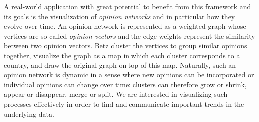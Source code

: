A real-world application with great potential to benefit from this framework and its goals is the visualization of \emph{opinion networks} \cite{betz2019applying} and in particular how they evolve over time.
An opinion network is represented as a weighted graph whose vertices are so-called \emph{opinion vectors} and the edge weights represent the similarity between two opinion vectors.
Betz \etal{} \cite{betz2019applying} cluster the vertices to group similar opinions together, visualize the graph as a map in which each cluster corresponds to a country, and draw the original graph on top of this map.
Naturally, such an opinion network is dynamic in a sense where new opinions can be incorporated or individual opinions can change over time: clusters can therefore grow or shrink, appear or disappear, merge or split.
We are interested in visualizing such processes effectively in order to find and communicate important trends in the underlying data.
